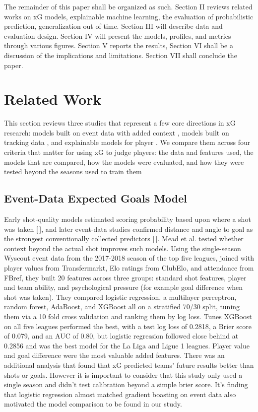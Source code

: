 \documentclass[conference]{IEEEtran}
\begin{document}
The remainder of this paper shall be organized as such. Section II reviews related works on xG models, explainable machine learning, the evaluation of probabilistic prediction, generalization out of time. Section III will describe data and evaluation design. Section IV will present the models, profiles, and metrics through various figures. Section V reports the results, Section VI shall be a discussion of the implications and limitations. Section VII shall conclude the paper.

\section{Related Work}

This section reviews three studies that represent a few core directions in xG research: models built on event data with added context \cite{mead2023}, models built on tracking data \cite{anzer2021}, and explainable models for player \cite{cavus2022}. We compare them across four criteria that matter for using xG to judge players: the data and features used, the models that are compared, how the models were evaluated, and how they were tested beyond the seasons used to train them

\subsection{Event-Data Expected Goals Model}

Early shot-quality models estimated scoring probability based upon where a shot was taken {[\,]}, and later event-data studies confirmed distance and angle to goal as the strongest conventionally collected predictors {[\,]}. Mead et al. \cite{mead2023} tested whether context beyond the actual shot improves such models. Using the single-season Wyscout event data from the 2017-2018 season of the top five leagues, joined with player values from Transfermarkt, Elo ratings from ClubElo, and attendance from FBref, they built 20 features across three groups: standard shot features, player and team ability, and psychological pressure (for example goal difference when shot was taken). They compared logistic regression, a multilayer perceptron, random forest, AdaBoost, and XGBoost all on a stratified 70/30 split, tuning them via a 10 fold cross validation and ranking them by log loss. Tunes XGBoost on all five leagues performed the best, with a test log loss of 0.2818, a Brier score of 0.079, and an AUC of 0.80, but logistic regression followed close behind at 0.2856 and was the best model for the La Liga and Ligue 1 leagues. Player value and goal difference were the most valuable added features. There was an additional analysis that found that xG predicted teams' future results better than shots or goals. However it is important to consider that this study only used a single season and didn't test calibration beyond a simple brier score. It's finding that logistic regression almost matched gradient boasting on event data also motivated the model comparison to be found in our study.
\end{document}
